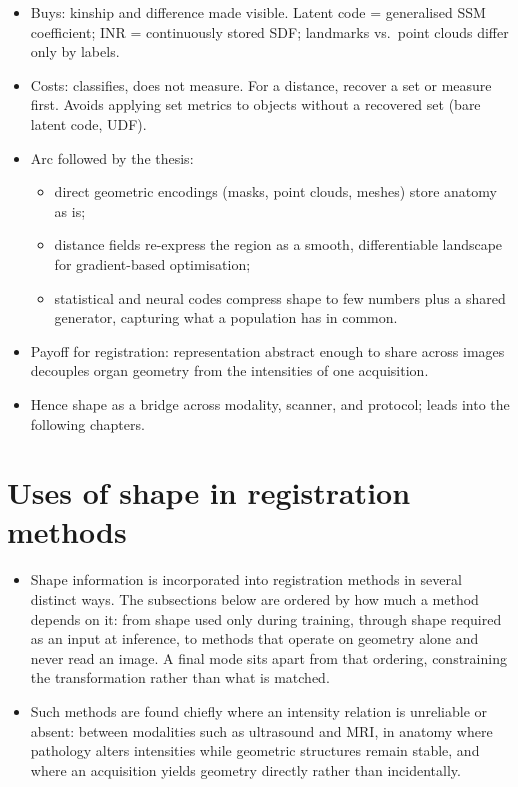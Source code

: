 \begin{itemize}
    \item Buys: kinship and difference made visible. Latent code = generalised SSM coefficient; INR = continuously stored SDF; landmarks vs.\ point clouds differ only by labels.
    \item Costs: classifies, does not measure. For a distance, recover a set or measure first. Avoids applying set metrics to objects without a recovered set (bare latent code, UDF).
    \item Arc followed by the thesis:
    \begin{itemize}
        \item direct geometric encodings (masks, point clouds, meshes) store anatomy as is;
        \item distance fields re-express the region as a smooth, differentiable landscape for gradient-based optimisation;
        \item statistical and neural codes compress shape to few numbers plus a shared generator, capturing what a population has in common.
    \end{itemize}
    \item Payoff for registration: representation abstract enough to share across images decouples organ geometry from the intensities of one acquisition.
    \item Hence shape as a bridge across modality, scanner, and protocol; leads into the following chapters.
\end{itemize}

\section{Uses of shape in registration methods}
\label{sec:bg-shape-uses}


\begin{itemize}
\item Shape information is incorporated into registration methods in several distinct ways. The subsections below are ordered by how much a method depends on it: from shape used only during training, through shape required as an input at inference, to methods that operate on geometry alone and never read an image. A final mode sits apart from that ordering, constraining the transformation rather than what is matched.
\item Such methods are found chiefly where an intensity relation is unreliable or absent: between modalities such as ultrasound and MRI, in anatomy where pathology alters intensities while geometric structures remain stable, and where an acquisition yields geometry directly rather than incidentally.
\end{itemize}


